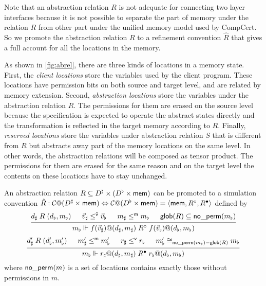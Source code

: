 \documentclass[acmsmall,review,anonymous]{acmart}\settopmatter{printfolios=true,printccs=false,printacmref=false}
\begin{document}


Note that an abstraction relation $R$
is not adequate for connecting two layer interfaces
because
it is not possible to separate
the part of memory under the relation $R$
from other part
under the unified memory model
used by CompCert.
So we promote the abstraction relation $R$
to a refinement convention $\hat{R}$
that gives a full account for
all the locations in the memory.

As shown in \autoref{fig:abrel},
there are three kinds of locations in a memory state.
First, the \emph{client locations} store the variables used
by the client program.
These locations have permission bits
on both source and target level,
and are related by memory extension.
Second, \emph{abstraction locations} store the variables
under the abstraction relation $R$.
The permissions for them are erased on the source level
because the specification is expected to
operate the abstract states directly
and the transformation is reflected
in the target memory according to $R$.
Finally, \emph{reserved locations} store the variables
under abstraction relation $S$
that is different from $R$
but abstracts away part of the memory locations
on the same level.
In other words, the abstraction relations
will be composed as tensor product.
The permissions for them are erased for the same reason
and on the target level the contents on these locations
have to stay unchanged.

\begin{definition}
  An abstraction relation
  $R \subseteq D^\sharp \times (D^\flat \times  \mathsf{mem} )$
  can be promoted to a simulation convention
  $\hat{R}: \mathcal{C}@(D^\sharp \times  \mathsf{mem} )
  \Leftrightarrow \mathcal{C}@(D^\flat \times  \mathsf{mem} )
  = \langle  \mathsf{mem} , R^\circ, R^\bullet \rangle$
  defined by
  \[
    \begin{prooftree}
      \hypo{d_\sharp \mathrel{R} (d_\flat, m_\flat)}
      \hypo{\vec{v}_\sharp \mathrel{\le^\kw{\vec{v}}} \vec{v}_\flat}
      \hypo{m_\sharp \le^\kw{m} m_\flat}
      \hypo{\kw{glob}(R) \subseteq \kw{no\_perm}(m_\flat)}
      \infer4
      {m_\flat \Vdash
        f(\vec{v}_\sharp)@(d_\sharp, m_\sharp) \mathrel{R^\que}
        f(\vec{v}_\flat)@(d_\flat, m_\flat)}
    \end{prooftree}
  \]
  \[
    \begin{prooftree}
      \hypo{d'_\sharp \mathrel{R} (d'_\flat, m'_\flat)}
      \hypo{m'_\sharp \mathrel{\le^\kw{m}} m'_\flat}
      \hypo{r_\sharp \mathrel{\le^\kw{v}} r_\flat}
      \hypo{m'_\flat \cong_{\kw{no\_perm}(m_\flat) - \kw{glob}(R)} m_\flat}
      \infer4
      {m_\flat \Vdash
        r_\sharp @ (d_\sharp, m_\sharp) \mathrel{R^\ans}r_\flat @ (d_\flat, m_\flat)}
    \end{prooftree}
  \]
  where $ \mathsf{no\_perm} (m)$
  is a set of locations contains exactly
  those without permissions in $m$.
\end{definition}
\end{document}
